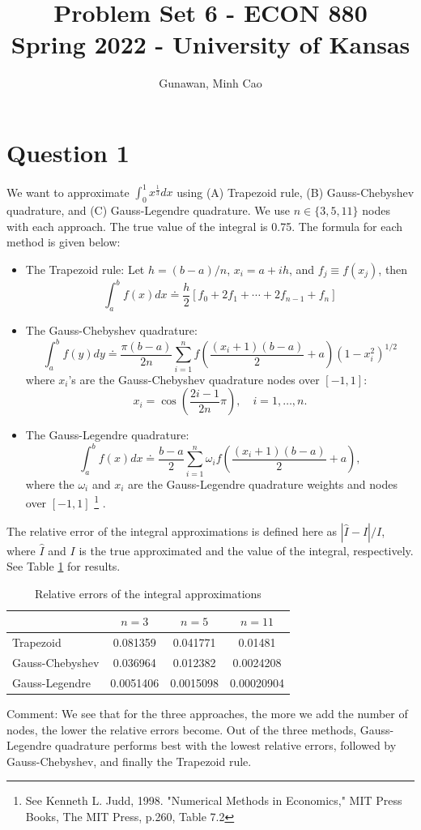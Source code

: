 \documentclass[11pt]{article}
\title{Problem Set 6 - ECON 880\\
	\small Spring 2022 - University of Kansas}
\author{Gunawan, Minh Cao}
\newcommand{\1}{\mathbbm{1}}
\newcounter{daggerfootnote}
\newcommand*{\daggerfootnote}[1]{%
	\setcounter{daggerfootnote}{\value{footnote}}%
	\renewcommand*{\thefootnote}{\fnsymbol{footnote}}%
	\footnote[2]{#1}%
	\setcounter{footnote}{\value{daggerfootnote}}%
	\renewcommand*{\thefootnote}{\arabic{footnote}}%
}
\begin{document}
\maketitle	
\section*{Question 1}
We want to approximate $\int_0^1x^{\frac{1}{3}}dx$ using (A) Trapezoid rule, (B) Gauss-Chebyshev quadrature, and (C) Gauss-Legendre quadrature. We use $n\in\{3,5,11\}$ nodes with each approach. The true value of the integral is 0.75. The formula for each method is given below:
\begin{itemize}
\item The Trapezoid rule: Let $h=(b-a)/n$, $x_i=a+ih$, and $f_j\equiv f(x_j)$, then
$$\int_{a}^{b} f(x) d x\doteq\frac{h}{2}\left[f_{0}+2 f_{1}+\cdots+2 f_{n-1}+f_{n}\right]$$
\item The Gauss-Chebyshev quadrature:
$$
\int_{a}^{b} f(y) d y \doteq \frac{\pi(b-a)}{2 n} \sum_{i=1}^{n} f\left(\frac{\left(x_{i}+1\right)(b-a)}{2}+a\right)\left(1-x_{i}^{2}\right)^{1 / 2}
$$
where $x_i$'s are the Gauss-Chebyshev quadrature nodes over $[-1,1]$:
$$
x_{i}=\cos \left(\frac{2 i-1}{2 n} \pi\right), \quad i=1, \ldots, n .
$$
\item The Gauss-Legendre quadrature:
$$
\int_{a}^{b} f(x) d x \doteq \frac{b-a}{2} \sum_{i=1}^{n} \omega_{i} f\left(\frac{\left(x_{i}+1\right)(b-a)}{2}+a\right),
$$
where the $\omega_i$ and $x_i$ are the Gauss-Legendre quadrature weights and nodes over $[-1,1]$\daggerfootnote{See Kenneth L. Judd, 1998. "Numerical Methods in Economics," MIT Press Books, The MIT Press, p.260, Table 7.2}.
\end{itemize}
The relative error of the integral approximations is defined here as $|\hat{I}-I|/I$, where $\hat{I}$ and $I$ is the true approximated and the value of the integral, respectively. See Table \ref{tab:1} for results.

\begin{table}[H]
	\centering
\begin{tabular}{ |l||c|c|c|  }
 \hline
               & $n=3$ &$n=5$&$n=11$\\
 \hline
    Trapezoid      & 0.081359     &0.041771 &   0.01481\\
     Gauss-Chebyshev   &     0.036964    & 0.012382     &0.0024208\\
 Gauss-Legendre   &0.0051406   & 0.0015098 & 0.00020904\\
  \hline
\end{tabular}
	\caption{Relative errors of the integral approximations}
\label{tab:1}
\end{table}
Comment: We see that for the three approaches, the more we add the number of nodes, the lower the relative errors become. Out of the three methods, Gauss-Legendre quadrature performs best with the lowest relative errors, followed by Gauss-Chebyshev, and finally the Trapezoid rule.
\end{document}
